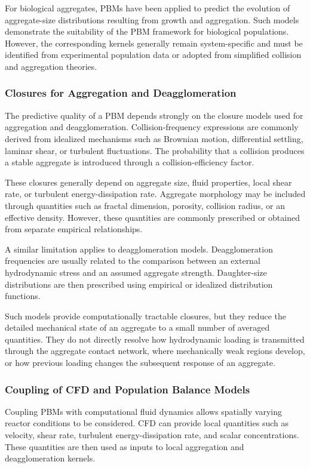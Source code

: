 \documentclass[11pt,a4paper,twoside]{scrartcl}
\begin{document}
For biological aggregates, PBMs have been applied to predict the evolution of aggregate-size distributions resulting from growth and aggregation. Such models demonstrate the suitability of the PBM framework for biological populations. However, the corresponding kernels generally remain system-specific and must be identified from experimental population data or adopted from simplified collision and aggregation theories.

\subsubsection{Closures for Aggregation and Deagglomeration}

The predictive quality of a PBM depends strongly on the closure models used for aggregation and deagglomeration. Collision-frequency expressions are commonly derived from idealized mechanisms such as Brownian motion, differential settling, laminar shear, or turbulent fluctuations. The probability that a collision produces a stable aggregate is introduced through a collision-efficiency factor.

These closures generally depend on aggregate size, fluid properties, local shear rate, or turbulent energy-dissipation rate. Aggregate morphology may be included through quantities such as fractal dimension, porosity, collision radius, or an effective density. However, these quantities are commonly prescribed or obtained from separate empirical relationships.

A similar limitation applies to deagglomeration models. Deagglomeration frequencies are usually related to the comparison between an external hydrodynamic stress and an assumed aggregate strength. Daughter-size distributions are then prescribed using empirical or idealized distribution functions.

Such models provide computationally tractable closures, but they reduce the detailed mechanical state of an aggregate to a small number of averaged quantities. They do not directly resolve how hydrodynamic loading is transmitted through the aggregate contact network, where mechanically weak regions develop, or how previous loading changes the subsequent response of an aggregate.

\subsubsection{Coupling of CFD and Population Balance Models}

Coupling PBMs with computational fluid dynamics allows spatially varying reactor conditions to be considered. CFD can provide local quantities such as velocity, shear rate, turbulent energy-dissipation rate, and scalar concentrations. These quantities are then used as inputs to local aggregation and deagglomeration kernels.
\end{document}
